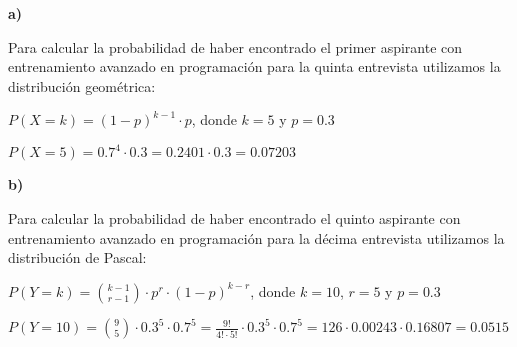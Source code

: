 \documentclass[11pt]{article}
\begin{document}
\textbf{a)} \par
Para calcular la probabilidad de haber encontrado el primer aspirante con entrenamiento avanzado en programaci\'on para la quinta entrevista utilizamos la distribuci\'on geom\'etrica: \par
$P(X=k) = (1-p)^{k-1} \cdot p$, donde $k = 5$ y $p = 0.3$ \par
$P(X=5) = 0.7^4 \cdot 0.3 = 0.2401 \cdot 0.3 = 0.07203 $


\textbf{b)} \par
Para calcular la probabilidad de haber encontrado el quinto aspirante con entrenamiento avanzado en programaci\'on para la d\'ecima entrevista utilizamos la distribuci\'on de Pascal: \par
$P(Y=k) = \binom{k-1}{r-1} \cdot p^r \cdot (1-p)^{k-r}$, donde $k = 10$, $r = 5$ y $p = 0.3$ \par
$P(Y=10) = \binom{9}{5} \cdot 0.3^5 \cdot 0.7^5 = \frac{9!}{4! \cdot 5!} \cdot 0.3^5 \cdot 0.7^5 = 126 \cdot 0.00243 \cdot 0.16807 = 0.0515$
\end{document}

